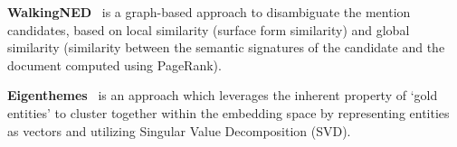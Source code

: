 \documentclass[11pt]{article}
\begin{document}

\noindent
\textbf{WalkingNED}~\cite{guo2018robust} is a graph-based approach to disambiguate the mention candidates, based on local similarity (surface form similarity) and global similarity (similarity between the semantic signatures of the candidate and the document computed using PageRank). 


\noindent
\textbf{Eigenthemes}~\cite{arora2021low} 
is an approach which
leverages the inherent property of `gold entities' to cluster together within the embedding space by representing entities as vectors and utilizing Singular Value Decomposition (SVD).
\end{document}
